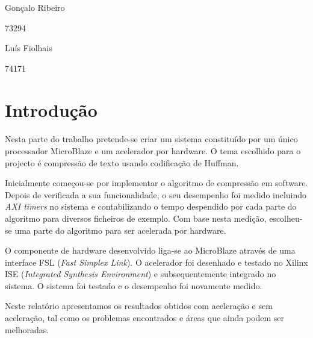 \documentclass[a4paper]{article}
\begin{document}



	\trSetAuthors
		{
		\begin{center}
		Gonçalo Ribeiro

		73294
		\end{center}
		}{
		\begin{center}
		Luís Fiolhais

		74171
		\end{center}
		}


	\trMakeCover

	\tableofcontents
	\pagebreak

	\section{Introdução}

	\paragraph{} Nesta parte do trabalho pretende-se criar um sistema constituído por um único processador MicroBlaze e um acelerador por hardware. O tema escolhido para o projecto é compressão de texto usando codificação de Huffman.

	Inicialmente começou-se por implementar o algoritmo de compressão em software. Depois de verificada a sua funcionalidade, o seu desempenho foi medido incluindo \textit{AXI timers} no sistema e contabilizando o tempo despendido por cada parte do algoritmo para diversos ficheiros de exemplo. Com base nesta medição, escolheu-se uma parte do algoritmo para ser acelerada por hardware.

	O componente de hardware desenvolvido liga-se ao MicroBlaze através de uma interface FSL (\textit{Fast Simplex Link}). O acelerador foi desenhado e testado no Xilinx ISE (\textit{Integrated Synthesis Environment}) e subsequentemente integrado no sistema. O sistema foi testado e o desempenho foi novamente medido.

  Neste relatório apresentamos os resultados obtidos com aceleração e sem aceleração, tal como os problemas encontrados e áreas que ainda podem ser melhoradas.
\end{document}
